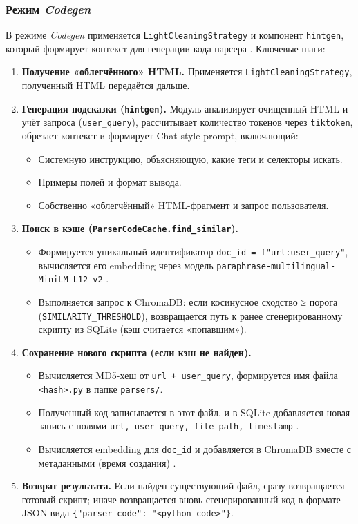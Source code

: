 \subsubsection{Режим \emph{Codegen}}
\label{sssec:codegen}

В режиме \emph{Codegen} применяется \texttt{LightCleaningStrategy} и компонент \texttt{hintgen}, который формирует контекст для генерации кода-парсера \cite{Li2024}. Ключевые шаги:
\begin{enumerate}
    \item \textbf{Получение «облегчённого» HTML.} Применяется \texttt{LightCleaningStrategy}, полученный HTML передаётся дальше.
    \item \textbf{Генерация подсказки (\texttt{hintgen}).} Модуль анализирует очищенный HTML и учёт запроса (\texttt{user\_query}), рассчитывает количество токенов через \texttt{tiktoken}, обрезает контекст и формирует Chat-style prompt, включающий:
    \begin{itemize}
        \item Системную инструкцию, объясняющую, какие теги и селекторы искать.
        \item Примеры полей и формат вывода.
        \item Собственно «облегчённый» HTML-фрагмент и запрос пользователя.
    \end{itemize}
    \item \textbf{Поиск в кэше (\texttt{ParserCodeCache.find\_similar}).}
    \begin{itemize}
        \item Формируется уникальный идентификатор \texttt{doc\_id = f"{url}:{user\_query}"}, вычисляется его embedding через модель \texttt{paraphrase-multilingual-MiniLM-L12-v2} \cite{Reimers2019}.
        \item Выполняется запрос к ChromaDB: если косинусное сходство ≥ порога (\texttt{SIMILARITY\_THRESHOLD}), возвращается путь к ранее сгенерированному скрипту из SQLite (кэш считается «попавшим»).
    \end{itemize}
    \item \textbf{Сохранение нового скрипта (если кэш не найден).}
    \begin{itemize}
        \item Вычисляется MD5-хеш от \texttt{url + user\_query}, формируется имя файла \texttt{<hash>.py} в папке \texttt{parsers/}.
        \item Полученный код записывается в этот файл, и в SQLite добавляется новая запись с полями \texttt{url, user\_query, file\_path, timestamp} \cite{SQLiteDocumentation}.
        \item Вычисляется embedding для \texttt{doc\_id} и добавляется в ChromaDB вместе с метаданными (время создания) \cite{ChromaDBDocumentation}.
    \end{itemize}
    \item \textbf{Возврат результата.} Если найден существующий файл, сразу возвращается готовый скрипт; иначе возвращается вновь сгенерированный код в формате JSON вида \texttt{\{"parser\_code": "<python\_code>"\}}.
\end{enumerate}

